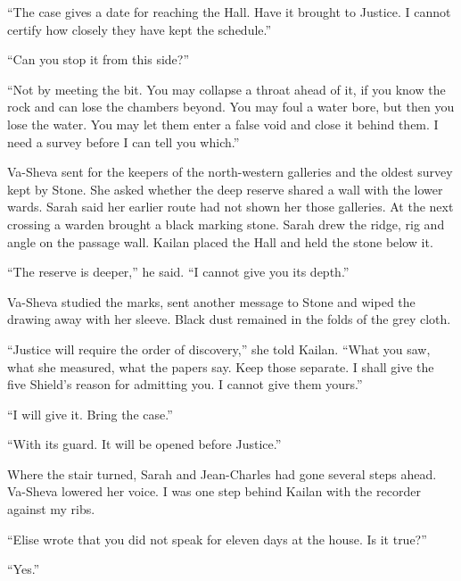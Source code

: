 ``The case gives a date for reaching the Hall. Have it brought to Justice. I cannot certify how closely they have kept the schedule.''\par

``Can you stop it from this side?''\par

``Not by meeting the bit. You may collapse a throat ahead of it, if you know the rock and can lose the chambers beyond. You may foul a water bore, but then you lose the water. You may let them enter a false void and close it behind them. I need a survey before I can tell you which.''\par

Va-Sheva sent for the keepers of the north-western galleries and the oldest survey kept by Stone. She asked whether the deep reserve shared a wall with the lower wards. Sarah said her earlier route had not shown her those galleries. At the next crossing a warden brought a black marking stone. Sarah drew the ridge, rig and angle on the passage wall. Kailan placed the Hall and held the stone below it.\par

``The reserve is deeper,'' he said. ``I cannot give you its depth.''\par

Va-Sheva studied the marks, sent another message to Stone and wiped the drawing away with her sleeve. Black dust remained in the folds of the grey cloth.\par

``Justice will require the order of discovery,'' she told Kailan. ``What you saw, what she measured, what the papers say. Keep those separate. I shall give the five Shield's reason for admitting you. I cannot give them yours.''\par

``I will give it. Bring the case.''\par

``With its guard. It will be opened before Justice.''\par

Where the stair turned, Sarah and Jean-Charles had gone several steps ahead. Va-Sheva lowered her voice. I was one step behind Kailan with the recorder against my ribs.\par

``Elise wrote that you did not speak for eleven days at the house. Is it true?''\par

``Yes.''\par

